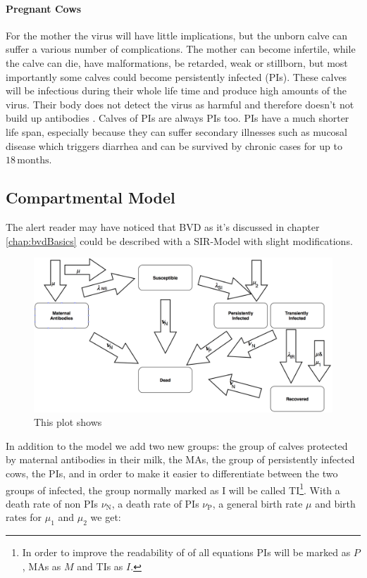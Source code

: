 \paragraph{Pregnant Cows}
For the mother the virus will have little implications, but the unborn calve can suffer a various number of complications. The mother can become infertile, while the calve can die, have malformations, be retarded, weak or stillborn, but most importantly some calves could become persistently infected (PIs). These calves will be infectious during their whole life time and produce high amounts of the virus. Their body does not detect the virus as harmful and therefore doesn't not build up antibodies \citep{personalCom}. Calves of PIs are always PIs too. PIs have a much shorter life span, especially because they can suffer secondary illnesses such as mucosal disease which triggers diarrhea and can be survived by chronic cases for up to $18\,\text{months}$.

\subsection{Compartmental Model}
The alert reader may have noticed that BVD as it's discussed in chapter \ref{chap:bvdBasics} could be described with a SIR-Model with slight modifications. 
\begin{figure}[htbp]
\centering
\noindent\includegraphics[width=\linewidth,height=\textheight,
keepaspectratio]{bvdDia.png} \caption[]{This plot shows }
\label{fig:bvdDia}
\end{figure}
In addition to the model we add two new groups: the group of calves protected by maternal antibodies in their milk, the MAs, the group of persistently infected cows, the PIs, and in order to make it easier to differentiate between the two groups of infected, the group normally marked as I will be called TI\footnote{In order to improve the readability of of all equations PIs will be marked as $P$, MAs as $M$ and TIs as $I$.}.
 With a death rate of non PIs $\nu_\text{N}$, a death rate of PIs $\nu_\text{P}$, a general birth rate $\mu$ and birth rates for $\mu_1$ and $\mu_2$ we get:

